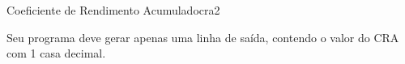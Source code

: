 \documentclass[12pt,a4paper,oneside]{article}
\begin{document}
\begin{problem}{Coeficiente de Rendimento Acumulado}{cra}{2}
\OutputFile

Seu programa deve gerar apenas uma linha de saída, contendo o valor do CRA com 1 casa decimal.


\Example

\begin{example}
%
\end{example}

\begin{example}
%
\end{example}

\begin{example}
%
\end{example}


\end{problem}
\end{document}
